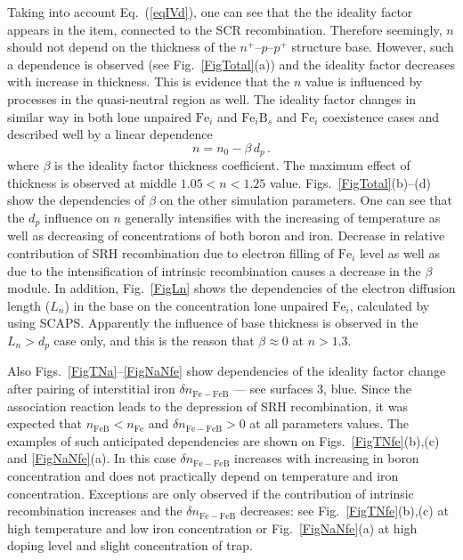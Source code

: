 \documentclass[12pt]{article}
\begin{document}
Taking into account Eq.~(\ref{eqIVd}), one can see that
the the ideality factor appears in the item, connected to the SCR recombination.
Therefore seemingly, $n$ should not depend on the thickness of the $n^+$--$p$--$p^+$ structure base.
However, such a dependence is observed (see Fig.~\ref{FigTotal}(a))
and the ideality factor decreases with increase in thickness.
This is evidence that the $n$ value is influenced by processes in the quasi-neutral region as well.
The ideality factor changes in similar way
in both lone unpaired $\mathrm{Fe}_i$ and $\mathrm{Fe}_i\mathrm{B}_s$ and $\mathrm{Fe}_i$ coexistence cases
and described well by a linear dependence
\begin{equation}
\label{eqN_D}
    n=n_0-\beta\,d_p\,.
\end{equation}
where
$\beta$ is the ideality factor thickness coefficient.
The maximum effect of thickness is observed at middle $1.05<n<1.25$ value.
Figs.~\ref{FigTotal}(b)--(d) show the dependencies of $\beta$ on the other simulation parameters.
One can see that the $d_p$ influence  on $n$ generally intensifies with the increasing of temperature as well as
decreasing of concentrations of both boron and iron.
Decrease in relative contribution of SRH recombination due to electron filling of $\mathrm{Fe}_i$ level as well as
due to the intensification of intrinsic recombination causes a decrease in the $\beta$ module.
In addition, Fig.~\ref{FigLn} shows the dependencies of the electron diffusion length ($ L_n $) in the base on the concentration
lone unpaired $\mathrm{Fe}_i$, calculated by using SCAPS.
Apparently the influence of base thickness is observed in the $L_n>d_p$ case only,
and this is the reason that  $\beta\approx0$ at $n>1.3$.


Also Figs.~\ref{FigTNa}--\ref{FigNaNfe} show dependencies of the ideality factor change
after pairing of interstitial iron $\delta n_\mathrm{Fe-FeB}$
--- see surfaces 3, blue.
Since the association reaction leads to the depression of SRH recombination, it was expected that
$n_\mathrm{FeB}<n_\mathrm{Fe}$ and $\delta n_\mathrm{Fe-FeB}>0$ at all parameters values.
The examples of such anticipated dependencies are shown on Figs.~\ref{FigTNfe}(b),(c) and \ref{FigNaNfe}(a).
In this case $\delta n_\mathrm{Fe-FeB}$ increases with increasing in boron concentration and does not practically depend
on temperature and iron concentration.
Exceptions are only observed if the contribution of intrinsic recombination increases and the $\delta n_\mathrm{Fe-FeB}$ decreases:
see Fig.~\ref{FigTNfe}(b),(c) at high temperature and low iron concentration
or Fig.~\ref{FigNaNfe}(a) at high doping level and slight concentration of trap.
\end{document}

